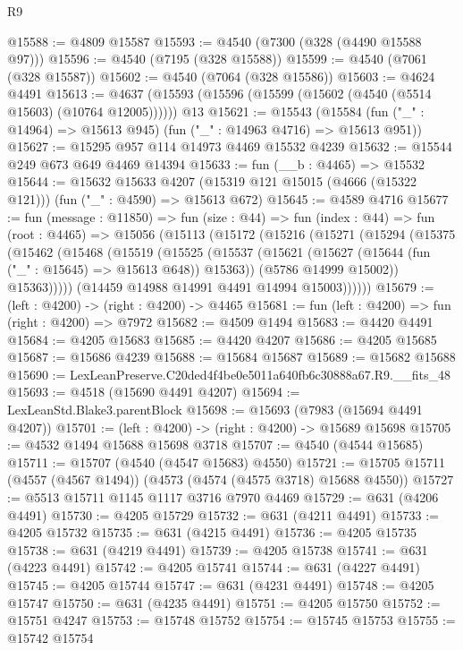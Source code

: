 \begin{lexlean}{R9}
\begin{coremodule}
@15588 := @4809 @15587
@15593 := @4540 (@7300 (@328 (@4490 @15588 @97)))
@15596 := @4540 (@7195 (@328 @15588))
@15599 := @4540 (@7061 (@328 @15587))
@15602 := @4540 (@7064 (@328 @15586))
@15603 := @4624 @4491
@15613 := @4637 (@15593 (@15596 (@15599 (@15602 (@4540 (@5514 @15603) (@10764 @12005)))))) @13
@15621 := @15543
    (@15584 (fun ("_" : @14964) => @15613 @945) (fun ("_" : @14963 @4716) => @15613 @951))
@15627 := @15295 @957 @114 @14973 @4469 @15532 @4239
@15632 := @15544 @249 @673 @649 @4469 @14394
@15633 := fun (__b : @4465) => @15532
@15644 := @15632
    @15633
    @4207
    (@15319 @121 @15015 (@4666 (@15322 @121)))
    (fun ("_" : @4590) => @15613 @672)
@15645 := @4589 @4716
@15677 := fun (message : @11850) =>
  fun (size : @44) =>
  fun (index : @44) =>
  fun (root : @4465) =>
  @15056
    (@15113
      (@15172
        (@15216
          (@15271
            (@15294
              (@15375
                (@15462
                  (@15468
                    (@15519
                      (@15525
                        (@15537
                          (@15621 (@15627 (@15644 (fun ("_" : @15645) => @15613 @648)) @15363))
                          (@5786 @14999 @15002))
                        @15363)))))
              (@14459 @14988 @14991 @4491 @14994 @15003))))))
@15679 := (left : @4200) -> (right : @4200) -> @4465
@15681 := fun (left : @4200) => fun (right : @4200) => @7972
@15682 := @4509 @1494
@15683 := @4420 @4491
@15684 := @4205 @15683
@15685 := @4420 @4207
@15686 := @4205 @15685
@15687 := @15686 @4239
@15688 := @15684 @15687
@15689 := @15682 @15688
@15690 := LexLeanPreserve.C20ded4f4be0e5011a640fb6c30888a67.R9.__fits_48
@15693 := @4518 (@15690 @4491 @4207)
@15694 := LexLeanStd.Blake3.parentBlock
@15698 := @15693 (@7983 (@15694 @4491 @4207))
@15701 := (left : @4200) -> (right : @4200) -> @15689 @15698
@15705 := @4532 @1494 @15688 @15698 @3718
@15707 := @4540 (@4544 @15685)
@15711 := @15707 (@4540 (@4547 @15683) @4550)
@15721 := @15705 @15711 (@4557 (@4567 @1494)) (@4573 (@4574 (@4575 @3718) @15688 @4550))
@15727 := @5513 @15711 @1145 @1117 @3716 @7970 @4469
@15729 := @631 (@4206 @4491)
@15730 := @4205 @15729
@15732 := @631 (@4211 @4491)
@15733 := @4205 @15732
@15735 := @631 (@4215 @4491)
@15736 := @4205 @15735
@15738 := @631 (@4219 @4491)
@15739 := @4205 @15738
@15741 := @631 (@4223 @4491)
@15742 := @4205 @15741
@15744 := @631 (@4227 @4491)
@15745 := @4205 @15744
@15747 := @631 (@4231 @4491)
@15748 := @4205 @15747
@15750 := @631 (@4235 @4491)
@15751 := @4205 @15750
@15752 := @15751 @4247
@15753 := @15748 @15752
@15754 := @15745 @15753
@15755 := @15742 @15754

\end{coremodule}
\end{lexlean}
